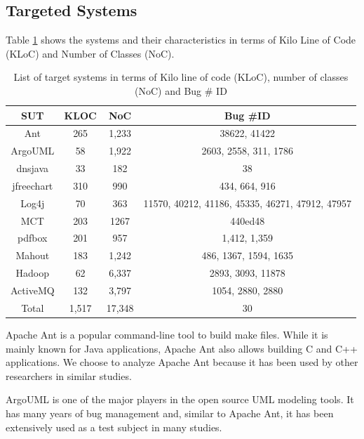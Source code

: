 \documentclass[times]{smrauth}
\begin{document}
\subsection{Targeted Systems}

Table \ref{tab:jacharming-systems} shows the systems and their characteristics in terms of
Kilo Line of Code (KLoC) and Number of Classes (NoC).

\begin{table}[h!]
\centering

\caption{List of target systems in terms of Kilo line of code (KLoC), number of classes (NoC) and Bug \# ID}
\begin{tabular}{c|c|c|c}
SUT        & KLOC & NoC  & Bug \#ID                                        \\ \hline \hline
Ant        & 265  & 1,233 & 38622, 41422                                    \\
ArgoUML    & 58   & 1,922 & 2603, 2558, 311, 1786                           \\
dnsjava    & 33   & 182  & 38                                              \\
jfreechart & 310  & 990  & 434, 664, 916                                   \\
Log4j      & 70   & 363  & 11570, 40212, 41186, 45335, 46271, 47912, 47957 \\
MCT        & 203  & 1267 & 440ed48                                         \\
pdfbox     & 201  & 957  & 1,412, 1,359 \\ 
Mahout 	   & 183  & 1,242 &  486, 1367, 1594, 1635\\
Hadoop 	   & 62   & 6,337 & 2893, 3093, 11878\\
ActiveMQ   & 132  & 3,797 & 1054, 2880, 2880\\ \hline 
Total      & 1,517 & 17,348 & 30 \\ 
\hline \hline 
\end{tabular}
\label{tab:jacharming-systems}
\end{table}


Apache Ant \cite{ApacheSoftwareFoundation} is a popular command-line tool to build
make files. While it is mainly known for Java applications,
Apache Ant also allows building C and C++ applications. We
choose to analyze Apache Ant because it has been used by
other researchers in similar studies.

ArgoUML \cite{CollabNet} is one of the major players in the open source
UML modeling tools. It has many years of bug management
and, similar to Apache Ant, it has been extensively used as a
test subject in many studies.
\end{document}
